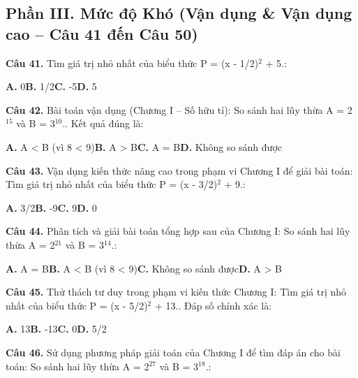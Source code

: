 \documentclass[11pt,a4paper]{article}
\begin{document}
\subsection*{\color{accent} Phần III. Mức độ Khó (Vận dụng \& Vận dụng cao -- Câu 41 đến Câu 50)}
\textbf{\color{primary} Câu 41.} Tìm giá trị nhỏ nhất của biểu thức P = (x - 1/2)$^2$ + 5.:\par
\hspace*{1.5em}\textbf{A.} 0\quad\quad \textbf{B.} 1/2\quad\quad \textbf{C.} -5\quad\quad \textbf{D.} 5\par\vspace{2pt}
\textbf{\color{primary} Câu 42.} Bài toán vận dụng (Chương I – Số hữu tỉ): So sánh hai lũy thừa A = 2$^{15}$ và B = 3$^{10}$.. Kết quả đúng là:\par
\hspace*{1.5em}\textbf{A.} A < B (vì 8 < 9)\quad\quad \textbf{B.} A > B\quad\quad \textbf{C.} A = B\quad\quad \textbf{D.} Không so sánh được\par\vspace{2pt}
\textbf{\color{primary} Câu 43.} Vận dụng kiến thức nâng cao trong phạm vi Chương I để giải bài toán: Tìm giá trị nhỏ nhất của biểu thức P = (x - 3/2)$^2$ + 9.:\par
\hspace*{1.5em}\textbf{A.} 3/2\quad\quad \textbf{B.} -9\quad\quad \textbf{C.} 9\quad\quad \textbf{D.} 0\par\vspace{2pt}
\textbf{\color{primary} Câu 44.} Phân tích và giải bài toán tổng hợp sau của Chương I: So sánh hai lũy thừa A = 2$^{21}$ và B = 3$^{14}$.:\par
\hspace*{1.5em}\textbf{A.} A = B\quad\quad \textbf{B.} A < B (vì 8 < 9)\quad\quad \textbf{C.} Không so sánh được\quad\quad \textbf{D.} A > B\par\vspace{2pt}
\textbf{\color{primary} Câu 45.} Thử thách tư duy trong phạm vi kiến thức Chương I: Tìm giá trị nhỏ nhất của biểu thức P = (x - 5/2)$^2$ + 13.. Đáp số chính xác là:\par
\hspace*{1.5em}\textbf{A.} 13\quad\quad \textbf{B.} -13\quad\quad \textbf{C.} 0\quad\quad \textbf{D.} 5/2\par\vspace{2pt}
\textbf{\color{primary} Câu 46.} Sử dụng phương pháp giải toán của Chương I để tìm đáp án cho bài toán: So sánh hai lũy thừa A = 2$^{27}$ và B = 3$^{18}$.:\par
\end{document}
